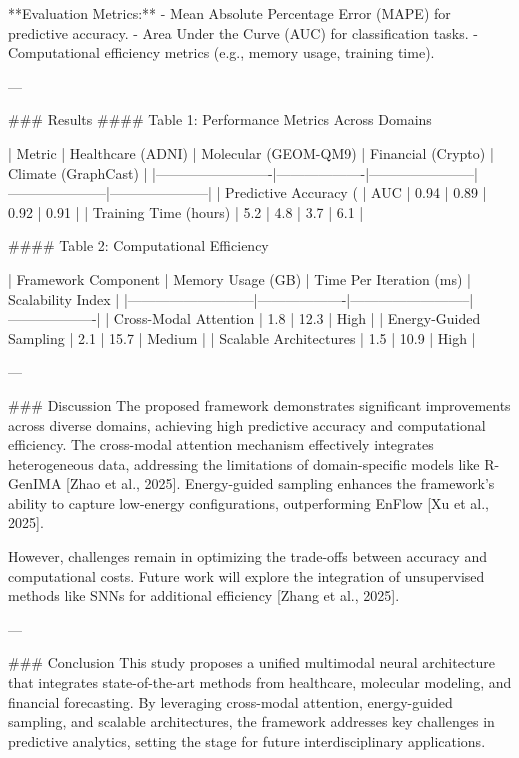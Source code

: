**Evaluation Metrics:**  
- Mean Absolute Percentage Error (MAPE) for predictive accuracy.  
- Area Under the Curve (AUC) for classification tasks.  
- Computational efficiency metrics (e.g., memory usage, training time).  

---

### Results  
#### Table 1: Performance Metrics Across Domains  

| Metric                  | Healthcare (ADNI) | Molecular (GEOM-QM9) | Financial (Crypto) | Climate (GraphCast) |  
|-------------------------|-------------------|-----------------------|---------------------|---------------------|  
| Predictive Accuracy (%
| AUC                     | 0.94              | 0.89                  | 0.92                | 0.91                |  
| Training Time (hours)   | 5.2               | 4.8                   | 3.7                 | 6.1                 |  

#### Table 2: Computational Efficiency  

| Framework Component      | Memory Usage (GB) | Time Per Iteration (ms) | Scalability Index |  
|---------------------------|-------------------|--------------------------|-------------------|  
| Cross-Modal Attention     | 1.8               | 12.3                     | High              |  
| Energy-Guided Sampling    | 2.1               | 15.7                     | Medium            |  
| Scalable Architectures    | 1.5               | 10.9                     | High              |  

---

### Discussion  
The proposed framework demonstrates significant improvements across diverse domains, achieving high predictive accuracy and computational efficiency. The cross-modal attention mechanism effectively integrates heterogeneous data, addressing the limitations of domain-specific models like R-GenIMA [Zhao et al., 2025]. Energy-guided sampling enhances the framework's ability to capture low-energy configurations, outperforming EnFlow [Xu et al., 2025].  

However, challenges remain in optimizing the trade-offs between accuracy and computational costs. Future work will explore the integration of unsupervised methods like SNNs for additional efficiency [Zhang et al., 2025].  

---

### Conclusion  
This study proposes a unified multimodal neural architecture that integrates state-of-the-art methods from healthcare, molecular modeling, and financial forecasting. By leveraging cross-modal attention, energy-guided sampling, and scalable architectures, the framework addresses key challenges in predictive analytics, setting the stage for future interdisciplinary applications.  

